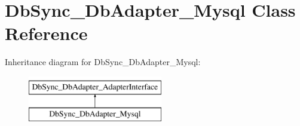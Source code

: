 \hypertarget{classDbSync__DbAdapter__Mysql}{
\section{DbSync\_\-DbAdapter\_\-Mysql Class Reference}
\label{classDbSync__DbAdapter__Mysql}
}
Inheritance diagram for DbSync\_\-DbAdapter\_\-Mysql:\begin{figure}[H]
\begin{center}
\leavevmode
\includegraphics[height=2.000000cm]{classDbSync__DbAdapter__Mysql}
\end{center}
\end{figure}
